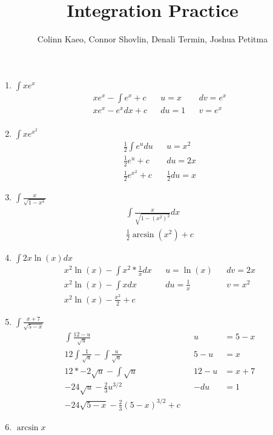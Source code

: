 \documentclass[11pt]{article}
\title{Integration Practice}
\author{Colinn Kaeo, Connor Shovlin, Denali Termin, Joshua Petitma}
\begin{document}
    \maketitle
    \begin{enumerate}
        \item $\int xe^x$
        \begin{align*}
            xe^x - \int e^x + c&& u = x && dv = e^x \\
            xe^x - e^x dx + c&& du = 1 && v = e^x \\
        \end{align*}
        \item $\int xe^{x^2}$
        \begin{align*}
            \frac{1}{2}\int e^u du&& u = x^2 \\
            \frac{1}{2} e^u + c && du = 2x \\
            \frac{1}{2}e^{x^2} + c&& \frac{1}{2}du = x
        \end{align*}
        \item $\int \frac{x}{\sqrt{1-x^4}}$
        \begin{align*}
            \int \frac{x}{\sqrt{1 - (x^2)^{2}}}dx \\
            \frac{1}{2}\arcsin(x^2) + c
        \end{align*}
        \item $\int 2x\ln(x)dx$
        \begin{align*}
            \label{q:5}
            x^2 \ln(x) - \int x^2 * \frac{1}{x}dx && u = \ln(x) && dv = 2x \\
            x^2 \ln(x) - \int xdx && du = \frac{1}{x} && v = x^2 \\
            x^2 \ln(x) - \frac{x^2}{2} + c
        \end{align*}
        \item $\int \frac{x + 7}{\sqrt{5-x}}$
        \begin{align*}
            \int \frac{12-u}{\sqrt{u}}&& u &= 5 - x \\
            12\int \frac{1}{\sqrt{u}} - \int \frac{u}{\sqrt{u}}&& 5 - u &= x \\
            12 * -2\sqrt{u} - \int \sqrt{u}&& 12 - u &= x+7 \\
            - 24\sqrt{u} - \frac{2}{3}u^{3/2}&& -du &= 1 \\
            - 24\sqrt{5-x} - \frac{2}{3}(5-x)^{3/2} + c
        \end{align*}
        \item $\arcsin x$

\end{enumerate}
\end{document}
